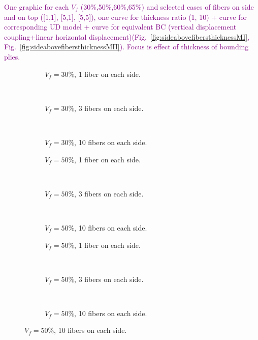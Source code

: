 \documentclass[review]{elsarticle}
\begin{document}
\textcolor{purple}{One graphic for each $V_{f}$ (30\%,50\%,60\%,65\%) and selected cases of fibers on side and on top ([1,1], [5,1], [5,5]),  one curve for thickness ratio (1, 10) + curve for corresponding UD model + curve for equivalent BC (vertical displacement coupling+linear horizontal displacement)(Fig.~\ref{fig:sideabovefibersthicknessMI},  Fig.~\ref{fig:sideabovefibersthicknessMII}). Focus is effect of thickness of bounding plies.}\\

\begin{figure}[!h]
\centering
    \begin{subfigure}[b]{0.3\textwidth}
        \caption{$V_{f}=30\%$, 1 fiber on each side.}\label{subfig:sideabovefiber30MIcase1}
    \end{subfigure} ~
   \begin{subfigure}[b]{0.3\textwidth}
        \caption{$V_{f}=30\%$, 3 fibers on each side.}\label{subfig:sideabovefiber30MIcase2}
    \end{subfigure} ~
\begin{subfigure}[b]{0.3\textwidth}
        \caption{$V_{f}=30\%$, 10 fibers on each side.}\label{subfig:sideabovefiber30MIcase3}
    \end{subfigure}

    \begin{subfigure}[b]{0.3\textwidth}
        \caption{$V_{f}=50\%$, 1 fiber on each side.}\label{subfig:sideabovefiber50MIcase1}
    \end{subfigure} ~
   \begin{subfigure}[b]{0.3\textwidth}
        \caption{$V_{f}=50\%$, 3 fibers on each side.}\label{subfig:sideabovefiber50MIcase2}
    \end{subfigure} ~
\begin{subfigure}[b]{0.3\textwidth}
        \caption{$V_{f}=50\%$, 10 fibers on each side.}\label{subfig:sideabovefiber50MIcase3}
    \end{subfigure}

    \begin{subfigure}[b]{0.3\textwidth}
        \caption{$V_{f}=50\%$, 1 fiber on each side.}\label{subfig:sideabovefiber60MIcase1}
    \end{subfigure} ~
   \begin{subfigure}[b]{0.3\textwidth}
        \caption{$V_{f}=50\%$, 3 fibers on each side.}\label{subfig:sideabovefiber60MIcase2}
    \end{subfigure} ~
\begin{subfigure}[b]{0.3\textwidth}
        \caption{$V_{f}=50\%$, 10 fibers on each side.}\label{subfig:sideabovefiber60MIcase3}
    \end{subfigure}


\end{figure}
\end{document}
